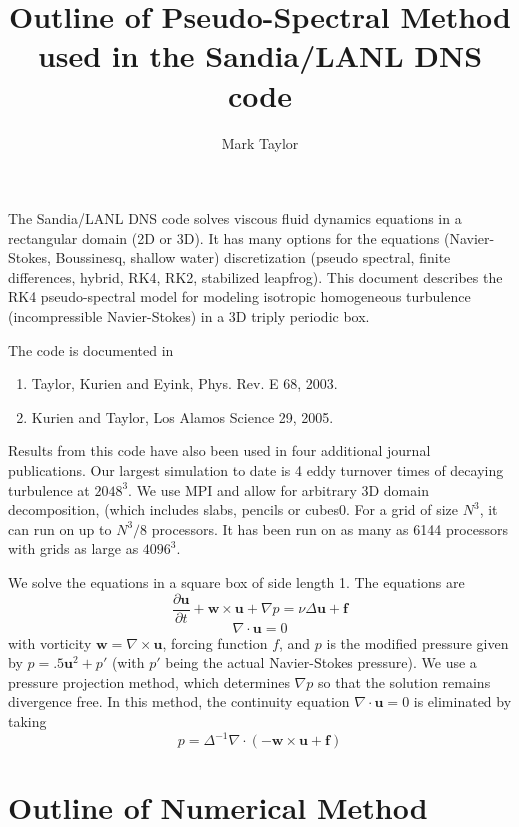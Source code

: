 \documentclass[12pt]{article}
\title{Outline of Pseudo-Spectral Method used in the Sandia/LANL DNS code}
\author{Mark Taylor}
\newcommand{\uv}{\mathbf u}
\newcommand{\vor}{\mathbf w}
\newcommand{\f}{\mathbf f}
\newcommand{\grad}{\nabla}
\newcommand{\curl}{\grad \times}
\renewcommand{\div}{\grad \cdot}
\begin{document}
\maketitle


The Sandia/LANL DNS code solves viscous fluid dynamics equations in a
rectangular domain (2D or 3D).  It has many options for the equations
(Navier-Stokes, Boussinesq, shallow water) discretization (pseudo spectral, 
finite differences, hybrid, RK4, RK2, stabilized leapfrog).  This document
describes the RK4 pseudo-spectral model for modeling isotropic homogeneous
turbulence (incompressible Navier-Stokes) in a 3D triply periodic box.

The code is documented in 
\begin{enumerate}
\item Taylor, Kurien and Eyink, Phys. Rev. E 68, 2003. 
\item Kurien and Taylor, Los Alamos Science 29, 2005. 
\end{enumerate}
Results from this code have also been used in four additional journal
publications.  Our largest simulation to date is 4 eddy turnover
times of decaying turbulence at $2048^3$.  We use MPI and allow
for arbitrary 3D domain decomposition, (which includes slabs,
pencils or cubes0.  For a grid of size $N^3$, it
can run on up to $N^3/8$ processors.  It has 
been run on as many as 6144 processors with grids as large
as $4096^3$.

We solve the equations in a square box of side length 1.
The equations are
\[
\frac{ \partial  \uv }{\partial t}  + \vor  \times \uv + 
\grad p   = \nu \Delta \uv + \f
\]
\[
\div \uv = 0
\]
with vorticity $\vor = \curl \uv$, forcing function $f$, and $p$ is the modified pressure
given by $p = .5 \uv^2 + p'$ (with $p'$ being the actual Navier-Stokes pressure).
We use a pressure projection method, which determines
$\grad p$ so that the solution remains
divergence free.  In this method, the continuity equation $\div \uv = 0$
is eliminated by taking
\[
 p =  \Delta^{-1} \div \left( -\vor \times \uv  + \f \right)
\]


\section{Outline of Numerical Method}
\end{document}
